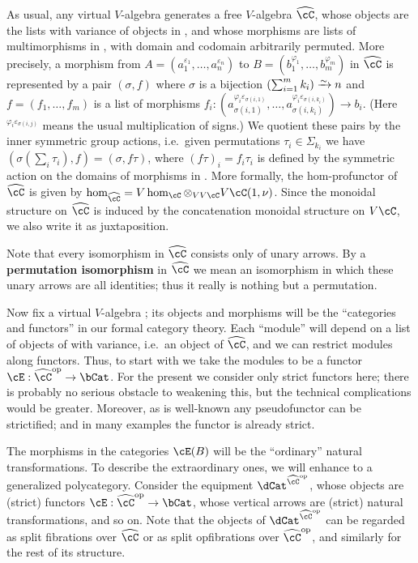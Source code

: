 \documentclass{amsart}
\newcommand{\C}{\cC}
\renewcommand{\Chat}{\ensuremath{\widehat{\C}}\xspace}
\newcommand{\E}{\cE}
\newcommand{\Tmult}{\nu}
\newcommand{\e}[1][]{^{\varepsilon_{#1}}}
\renewcommand{\ph}[1][]{^{\varphi_{#1}}}
\newcommand{\phe}[2]{^{\varphi_{#1}\varepsilon_{#2}}}
\begin{document}
As usual, any virtual $V$-algebra \C generates a free $V$-algebra \Chat, whose objects are the lists with variance of objects in \C, and whose morphisms are lists of multimorphisms in \C, with domain and codomain arbitrarily permuted.
More precisely, a morphism from $A=(a_1\e[1],\dots,a_n\e[n])$ to $B=(b_1\ph[1],\dots,b_m\ph[m])$ in \Chat is represented by a pair $(\sigma,f)$ where $\sigma$ is a bijection $\left(\sum_{i=1}^m k_i\right) \toiso n$ and $f=(f_1,\dots,f_m)$ is a list of morphisms $f_i:(a_{\sigma(i,1)}\phe{i}{\sigma(i,1)},\dots,a_{\sigma(i,k_i)}\phe{i}{\sigma(i,k_i)}) \to b_i$.
(Here $\phe{i}{\sigma(i,j)}$ means the usual multiplication of signs.)
We quotient these pairs by the inner symmetric group actions, i.e.\ given permutations $\tau_i\in\Sigma_{k_i}$ we have $(\sigma(\sum_i \tau_i), f) = (\sigma,f\tau)$, where $(f\tau)_i = f_i \tau_i$ is defined by the symmetric action on the domains of morphisms in \C.
More formally, the hom-profunctor of \Chat is given by $\hom_{\Chat} = V\hom_\C \otimes_{VV\C} V\C(1,\Tmult)$.
Since the monoidal structure on \Chat is induced by the concatenation monoidal structure on $V\C$, we also write it as juxtaposition.

Note that every isomorphism in \Chat consists only of unary arrows.
By a \textbf{permutation isomorphism} in \Chat we mean an isomorphism in which these unary arrows are all identities; thus it really is nothing but a permutation.

Now fix a virtual $V$-algebra \C; its objects and morphisms will be the ``categories and functors'' in our formal category theory.
Each ``module'' will depend on a list of objects of \C with variance, i.e.\ an object of \Chat, and we can restrict modules along functors.
Thus, to start with we take the modules to be a functor $\E:\Chat\op\to \bCat$.
For the present we consider only strict functors here; there is probably no serious obstacle to weakening this, but the technical complications would be greater.
Moreover, as is well-known any pseudofunctor can be strictified; and in many examples the functor is already strict.

The morphisms in the categories $\E(B)$ will be the ``ordinary'' natural transformations.
To describe the extraordinary ones, we will enhance \E to a generalized polycategory.
Consider the equipment $\dCat^{\Chat\op}$, whose objects are (strict) functors $\E:\Chat\op\to\bCat$, whose vertical arrows are (strict) natural transformations, and so on.
Note that the objects of $\dCat^{\Chat\op}$ can be regarded as split fibrations over $\Chat$ or as split opfibrations over $\Chat\op$, and similarly for the rest of its structure.
\end{document}
